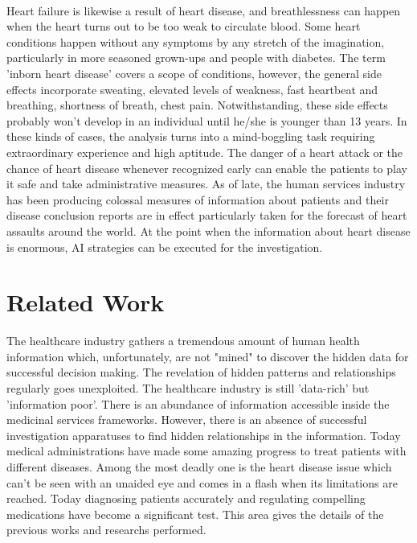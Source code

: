\documentclass[oneside,12pt]{Classes/VTU}
\begin{document}
    \paragraph{}
    Heart failure is likewise a result of heart disease, and breathlessness can happen when the heart turns out to be too weak to circulate blood. Some heart conditions happen without any symptoms by any stretch of the imagination, particularly in more seasoned grown-ups and people with diabetes. The term 'inborn heart disease' covers a scope of conditions, however, the general side effects incorporate sweating, elevated levels of weakness, fast heartbeat and breathing, shortness of breath, chest pain. Notwithstanding, these side effects probably won't develop in an individual until he/she is younger than 13 years. In these kinds of cases, the analysis turns into a mind-boggling task requiring extraordinary experience and high aptitude. The danger of a heart attack or the chance of heart disease whenever recognized early can enable the patients to play it safe and take administrative measures. As of late, the human services industry has been producing colossal measures of information about patients and their disease conclusion reports are in effect particularly taken for the forecast of heart assaults around the world. At the point when the information about heart disease is enormous, AI strategies can be executed for the investigation.
    
    
    \section{Related Work}
    The healthcare industry gathers a tremendous amount of human health information which, unfortunately, are not "mined" to discover the hidden data for successful decision making. The revelation of hidden patterns and relationships regularly goes unexploited. The healthcare industry is still 'data-rich' but 'information poor'. There is an abundance of information accessible inside the medicinal services frameworks. However, there is an absence of successful investigation apparatuses to find hidden relationships in the information. Today medical administrations have made some amazing progress to treat patients with different diseases. Among the most deadly one is the heart disease issue which can't be seen with an unaided eye and comes in a flash when its limitations are reached. Today diagnosing patients accurately and regulating compelling medications have become a significant test. This area gives the details of the previous works and researchs performed.
\end{document}
